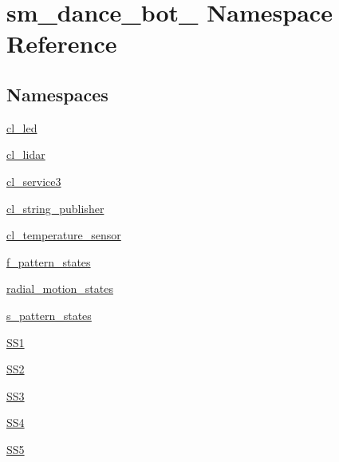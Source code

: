 \hypertarget{namespacesm__dance__bot__3}{}\section{sm\+\_\+dance\+\_\+bot\+\_ Namespace Reference}
\label{namespacesm__dance__bot__3}
\subsection*{Namespaces}
\begin{DoxyCompactItemize}
\item 
 \hyperlink{namespacesm__dance__bot__3_1_1cl__led}{cl\+\_\+led}
\item 
 \hyperlink{namespacesm__dance__bot__3_1_1cl__lidar}{cl\+\_\+lidar}
\item 
 \hyperlink{namespacesm__dance__bot__3_1_1cl__service3}{cl\+\_\+service3}
\item 
 \hyperlink{namespacesm__dance__bot__3_1_1cl__string__publisher}{cl\+\_\+string\+\_\+publisher}
\item 
 \hyperlink{namespacesm__dance__bot__3_1_1cl__temperature__sensor}{cl\+\_\+temperature\+\_\+sensor}
\item 
 \hyperlink{namespacesm__dance__bot__3_1_1f__pattern__states}{f\+\_\+pattern\+\_\+states}
\item 
 \hyperlink{namespacesm__dance__bot__3_1_1radial__motion__states}{radial\+\_\+motion\+\_\+states}
\item 
 \hyperlink{namespacesm__dance__bot__3_1_1s__pattern__states}{s\+\_\+pattern\+\_\+states}
\item 
 \hyperlink{namespacesm__dance__bot__3_1_1SS1}{S\+S1}
\item 
 \hyperlink{namespacesm__dance__bot__3_1_1SS2}{S\+S2}
\item 
 \hyperlink{namespacesm__dance__bot__3_1_1SS3}{S\+S3}
\item 
 \hyperlink{namespacesm__dance__bot__3_1_1SS4}{S\+S4}
\item 
 \hyperlink{namespacesm__dance__bot__3_1_1SS5}{S\+S5}
\end{DoxyCompactItemize}

